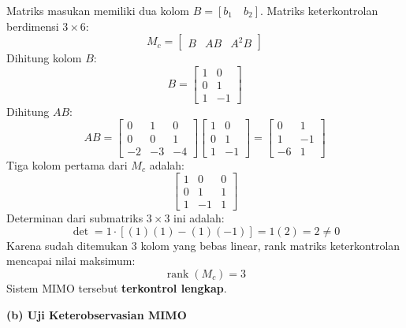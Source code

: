 \documentclass[11pt,a4paper]{article}
\begin{document}
Matriks masukan memiliki dua kolom $B = [b_1 \quad b_2]$. Matriks keterkontrolan berdimensi $3 \times 6$:
$$M_c = \begin{bmatrix} B & AB & A^2B \end{bmatrix}$$
Dihitung kolom $B$:
$$B = \begin{bmatrix} 1 & 0 \\ 0 & 1 \\ 1 & -1 \end{bmatrix}$$
Dihitung $AB$:
$$AB = \begin{bmatrix} 0 & 1 & 0 \\ 0 & 0 & 1 \\ -2 & -3 & -4 \end{bmatrix} \begin{bmatrix} 1 & 0 \\ 0 & 1 \\ 1 & -1 \end{bmatrix} = \begin{bmatrix} 0 & 1 \\ 1 & -1 \\ -6 & 1 \end{bmatrix}$$
Tiga kolom pertama dari $M_c$ adalah:
$$\begin{bmatrix} 1 & 0 & 0 \\ 0 & 1 & 1 \\ 1 & -1 & 1 \end{bmatrix}$$
Determinan dari submatriks $3 \times 3$ ini adalah:
$$\det = 1 \cdot [(1)(1) - (1)(-1)] = 1(2) = 2 \ne 0$$
Karena sudah ditemukan 3 kolom yang bebas linear, rank matriks keterkontrolan mencapai nilai maksimum:
$$\operatorname{rank}(M_c) = 3$$
Sistem MIMO tersebut \textbf{terkontrol lengkap}.

\textbf{(b) Uji Keterobservasian MIMO}
\end{document}
